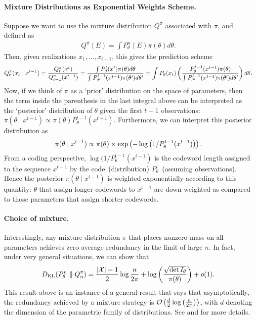 \documentclass[12pt]{article}
\begin{document}
\paragraph{Mixture Distributions as Exponential Weights Scheme.} Suppose we want to use the mixture distribution $Q^\pi$ associated with $\pi$, and defined as 
\begin{align}
    Q^\pi(E) = \int P_\theta^n(E) \pi(\theta) d\theta. 
\end{align}
Then, given realizations $x_1, \ldots, x_{t-1}$, this gives the prediction scheme 
\begin{align}
    Q_t^\pi(x_t \mid x^{t-1}) = \frac{Q_t^\pi(x^t)}{Q_{t-1}^\pi(x^{t-1})} =\frac{\int P_\theta^t(x^t)\pi(\theta) d\theta}{\int P_{\theta'}^{t-1}(x^{t-1})\pi(\theta') d\theta'} = \int P_\theta(x_t) \left( \frac{P_\theta^{t-1}(x^{t-1}) \pi(\theta)}{\int P_{\theta'}^{t-1}(x^{t-1})\pi(\theta') d\theta'} \right) d\theta. 
\end{align}
Now, if we think of $\pi$ as a `prior' distribution on the space of parameters, then the term inside the parenthesis in the last integral above can be interpreted as the `posterior' distribution of $\theta$ given the first $t-1$ observations: $\pi(\theta\mid x^{t-1}) \propto \pi(\theta) P_\theta^{t-1}(x^{t-1})$. Furthermore, we can interpret this posterior distribution as 
\begin{align}
    \pi(\theta \mid x^{t-1}) \propto \pi(\theta) \times \exp \left( - \log\big(1/P_\theta^{t-1}(x^{t-1})\big) \right). \label{eq:posterior-update-1}
\end{align}
From a coding perspective, $\log(1/P_\theta^{t-1}(x^{t-1})$ is the codeword length assigned to the sequence $x^{t-1}$ by the code~(distribution) $P_\theta$~(assuming \iid observations). Hence the posterior $\pi(\theta \mid x^{t-1})$ is weighted exponentially according to this quantity: $\theta$ that assign longer codewords to $x^{t-1}$ are down-weighted as compared to those parameters that assign shorter codewords. 

\paragraph{Choice of mixture.} Interestingly, any mixture distribution $\pi$ that places nonzero mass on all parameters achieves zero average redundancy in the limit of large $n$. In fact, under very general situations, we can show that 
\begin{align}
    D_{\text{KL}}(P_\theta^n \parallel Q_n^\pi) = \frac{|{\cal X}|-1}{2} \log \frac{n}{2\pi } + \log \left( \frac {\sqrt{\det I_\theta}} {\pi(\theta)} \right) + o(1).  \label{eq:redundancy-bound-1}
\end{align}
    This result above is an instance of a general result that says that asymptotically, the redundancy achieved by a mixture strategy is ${\cal O}\left( \frac d 2 \log \left( \frac n {2\pi } \right) \right)$, with $d$ denoting the dimension of the parametric family of distributions. See \cite[Theorem 16.4.1]{DuchiLectureNotes} and \cite{clarke1990information} for more details. 
\end{document}
